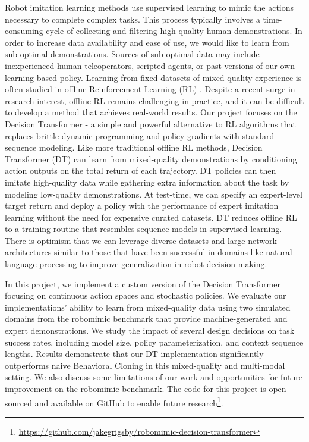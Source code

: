 Robot imitation learning methods use supervised learning to mimic the actions necessary to complete complex tasks. This process typically involves a time-consuming cycle of collecting and filtering high-quality human demonstrations. In order to increase data availability and ease of use, we would like to learn from sub-optimal demonstrations. Sources of sub-optimal data may include inexperienced human teleoperators, scripted agents, or past versions of our own learning-based policy. Learning from fixed datasets of mixed-quality experience is often studied in offline Reinforcement Learning (RL) \cite{levine2020offline}. Despite a recent surge in research interest, offline RL remains challenging in practice, and it can be difficult to develop a method that achieves real-world results. Our project focuses on the Decision Transformer \cite{decisiontransformer} - a simple and powerful alternative to RL algorithms that replaces brittle dynamic programming and policy gradients with standard sequence modeling. Like more traditional offline RL methods, Decision Transformer (DT) can learn from mixed-quality demonstrations by conditioning action outputs on the total return of each trajectory. DT policies can then imitate high-quality data while gathering extra information about the task by modeling low-quality demonstrations. At test-time, we can specify an expert-level target return and deploy a policy with the performance of expert imitation learning without the need for expensive curated datasets. DT reduces offline RL to a training routine that resembles sequence models in supervised learning. There is optimism that we can leverage diverse datasets and large network architectures similar to those that have been successful in domains like natural language processing to improve generalization in robot decision-making. 

    \par In this project, we implement a custom version of the Decision Transformer focusing on continuous action spaces and stochastic policies. We evaluate our implementations' ability to learn from mixed-quality data using two simulated domains from the robomimic benchmark \cite{robomimic2021} that provide machine-generated and expert demonstrations. We study the impact of several design decisions on task success rates, including model size, policy parameterization, and context sequence lengths. Results demonstrate that our DT implementation significantly outperforms naive Behavioral Cloning in this mixed-quality and multi-modal setting. We also discuss some limitations of our work and opportunities for future improvement on the robomimic benchmark. The code for this project is open-sourced and available on GitHub to enable future research\footnote{\url{https://github.com/jakegrigsby/robomimic-decision-transformer}}.


